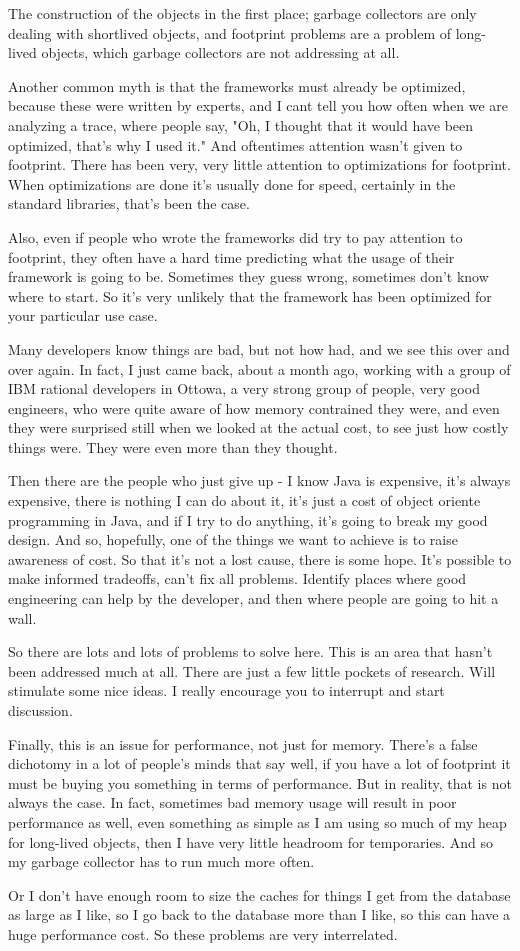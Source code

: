 The construction of the objects in the first place; garbage collectors are only dealing with shortlived objects, and footprint problems are a problem of long-lived objects, which garbage collectors are not addressing at all.

Another common myth is that the frameworks must already be optimized, because these were written by experts, and I cant tell you how often when we are analyzing a trace, where people say, "Oh, I thought that it would have been optimized, that's why I used it." And oftentimes attention wasn't given to footprint. There has been very, very little attention to optimizations for footprint.  When optimizations are done it's usually done for speed, certainly in the standard libraries, that's been the case.

Also, even if people who wrote the frameworks did try to pay attention to footprint, they often have a hard time predicting what the usage of their framework is going to be. Sometimes they guess wrong, sometimes don't know where to start.  So it's very unlikely that the framework has been optimized for your particular use case. 

Many developers know things are bad, but not how had, and we see this over and over again. In fact, I just came back, about a month ago, working with a group of IBM rational developers in Ottowa, a very strong group of people, very good engineers, who were quite aware of how memory contrained they were, and even they were surprised still when we looked at the actual cost, to see just how costly things were. They were even more than they thought.

Then there are the people who just give up - I know Java is expensive, it's always expensive, there is nothing I can do about it, it's just a cost of object oriente programming in Java, and if I try to do anything, it's going to break my good design.
And so, hopefully, one of the things we want to achieve is to raise awareness of cost. So that it's not a lost cause, there is some hope.  It's possible to make informed tradeoffs, can't fix all problems. Identify places where good engineering can help by the developer, and then where people are going to hit a wall.

So there are lots and lots of problems to solve here. This is an area that hasn't been addressed much at all.  There are just a few little pockets of research. Will stimulate some nice ideas. I really encourage you to interrupt and start discussion.

Finally, this is an issue for performance, not just for memory. There's a false dichotomy in a lot of people's minds that say well, if you have a lot of footprint it must be buying you something in terms of performance. But in reality, that is not always the case. In fact, sometimes bad memory usage will result in poor performance as well, even something as simple as I am using so much of my heap for long-lived objects, then I have very little headroom for temporaries.  And so my garbage collector has to run much more often. 

Or I don't have enough room to size the caches for things I get from the database as large as I like, so I go back to the database more than I like, so this can have a huge performance cost. So these problems are very interrelated.